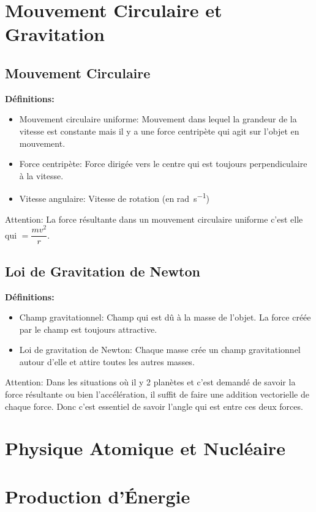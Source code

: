 \documentclass[french, a4paper, 12pt]{article}
\begin{document}
\section{Mouvement Circulaire et Gravitation}
\subsection{Mouvement Circulaire}
\textbf{Définitions:}
\begin{itemize}
\item Mouvement circulaire uniforme: Mouvement dans lequel la grandeur de la vitesse est constante mais il y a une force centripète qui agit sur l'objet en mouvement.
\item Force centripète: Force dirigée vers le centre qui est toujours perpendiculaire à la vitesse.
\item Vitesse angulaire: Vitesse de rotation (en \si{\radian\per\second})
\end{itemize}
Attention: La force résultante dans un mouvement circulaire uniforme c'est elle qui $=\dfrac{mv^2}{r}$.

\subsection{Loi de Gravitation de Newton}
\textbf{Définitions:}
\begin{itemize}
\item Champ gravitationnel: Champ qui est dû à la masse de l'objet. La force créée par le champ est toujours attractive.
\item Loi de gravitation de Newton: Chaque masse crée un champ gravitationnel autour d'elle et attire toutes les autres masses.
\end{itemize}
Attention: Dans les situations où il y 2 planètes et c'est demandé de savoir la force résultante ou bien l'accélération, il suffit de faire une addition vectorielle de chaque force. Donc c'est essentiel de savoir l'angle qui est entre ces deux forces.
\pagebreak

\section{Physique Atomique et Nucléaire}
\pagebreak

\section{Production d'Énergie}
\pagebreak
\end{document}
